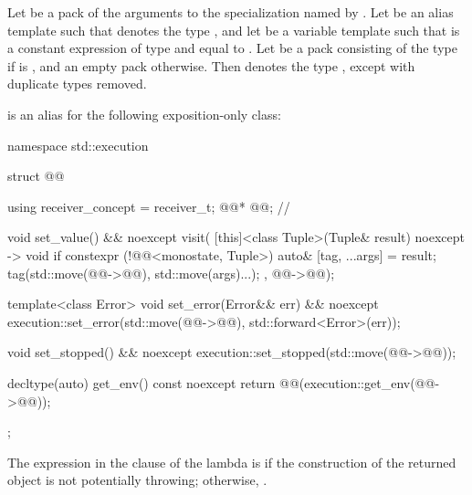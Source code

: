 \pnum
Let  be
a pack of the arguments to the  specialization
named by .
Let  be an alias template such that
 denotes
the type , and
let  be a variable template such that
 is
a constant expression of type  and
equal to .
Let  be a pack consisting of
the type 
if  is ,
and an empty pack otherwise.
Then  denotes
the type ,
except with duplicate types removed.

\pnum
{} is an alias for the following exposition-only class:
\begin{codeblock}
namespace std::execution {
  struct @@ {
    using receiver_concept = receiver_t;
    @@* @@;          // \expos

    void set_value() && noexcept {
      visit(
        [this]<class Tuple>(Tuple& result) noexcept -> void {
          if constexpr (!@@<monostate, Tuple>) {
            auto& [tag, ...args] = result;
            tag(std::move(@@->@@), std::move(args)...);
          }
        },
        @@->@@);
    }

    template<class Error>
    void set_error(Error&& err) && noexcept {
      execution::set_error(std::move(@@->@@), std::forward<Error>(err));
    }

    void set_stopped() && noexcept {
      execution::set_stopped(std::move(@@->@@));
    }

    decltype(auto) get_env() const noexcept {
      return @@(execution::get_env(@@->@@));
    }
  };
}
\end{codeblock}

\pnum
The expression in the  clause of the lambda is 
if the construction of the returned  object
is not potentially throwing;
otherwise, .

